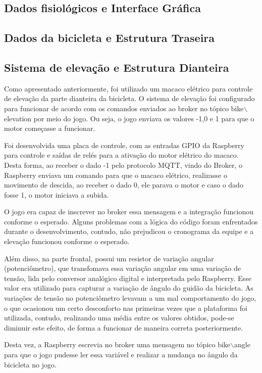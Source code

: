 \subsection{Dados fisiológicos e Interface Gráfica}

\subsection{Dados da bicicleta e Estrutura Traseira}

\subsection{Sistema de elevação e Estrutura Dianteira}

Como apresentado anteriormente, foi utilizado um macaco elétrico para controle de elevação da parte dianteira da bicicleta. O sistema de elevação foi configurado para funcionar de acordo com os comandos enviados ao broker no tópico bike$\backslash$elevation por meio do jogo. Ou seja, o jogo enviava os valores -1,0 e 1 para que o motor começasse a funcionar.

Foi desenvolvida uma placa de controle, com as entradas GPIO da Raspberry para controle e saídas de relés para a ativação do motor elétrico do macaco. Desta forma, ao receber o dado -1 pelo protocolo MQTT, vindo do Broker, o Raspberry enviava um comando para que o macaco elétrico, realizasse o movimento de descida, ao receber o dado 0, ele parava o motor e caso o dado fosse 1, o motor iniciava a subida. 

O jogo era capaz de inscrever no broker essa mensagem e a integração funcionou conforme o esperado. Alguns problemas com a lógica do código foram enfrentados durante o desenvolvimento, contudo, não prejudicou o cronograma da equipe e a elevação funcionou conforme o esperado.

Além disso, na parte frontal, possui um resistor de variação angular (potenciômetro), que transfomava essa variação angular em uma variação de tensão, lida pelo conversor analógico digital e interpretada pelo Raspberry. Esse valor era utilizado para capturar a variação de ângulo do guidão da bicicleta. As variações de tensão no potenciômetro levavam a um mal comportamento do jogo, o que ocasionou um certo desconforto nas primeiras vezes que a plataforma foi utilizada, contudo, realizando uma média entre os valores obtidos, pode-se diminuir este efeito, de forma a funcionar de maneira correta posteriormente.

Desta vez, a Raspberry escrevia no broker uma mensagem no tópico bike$\backslash$angle para que o jogo pudesse ler essa variável e realizar a mudança no ângulo da bicicleta no jogo. 

